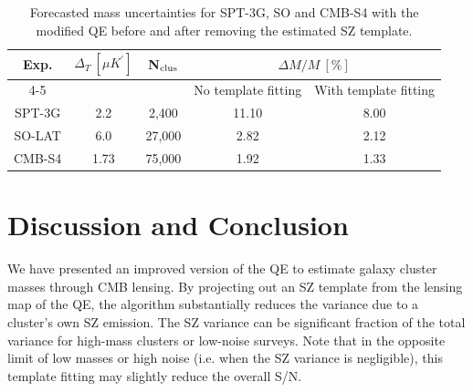\begin{table}
\caption{Forecasted mass uncertainties for SPT-3G, SO and CMB-S4  with the modified QE before and after removing the estimated SZ template.}
\footnotesize{
\centering
\begin{tabular}{| c | c |  c | c | c  |}
\hline
 \multirow{2}{*}{Exp.} &  \multirow{2}{*}{$\Delta_{T}\ [\mu K^{\prime}]$} & \multirow{3}{*}{N$_{\rm clus}$} & \multicolumn{2}{c|}{$\Delta M/M\ [\%]$}\\
\cline{4-5}
 & & & No template fitting & With template fitting\\\hline
SPT-3G & 2.2 & 2,400 &11.10& 8.00 \\\hline
 SO-LAT & 6.0 & 27,000 &2.82 &2.12 \\\hline
CMB-S4 & 1.73 & 75,000 &1.92 & 1.33\\\hline

\end{tabular}
}
\label{table_forecast_setup}
\end{table}


\section{Discussion and Conclusion}
\label{temp_fit_conclusions}

We have presented an improved version of the QE to estimate galaxy cluster masses through CMB lensing. 
By projecting out an SZ template from the lensing map of the QE, the algorithm substantially reduces the variance due to a cluster's own SZ emission. 
The SZ variance can be significant fraction of the total variance for high-mass clusters or low-noise surveys. 
Note that in the opposite limit of low masses or high noise (i.e. when the SZ variance is negligible), this template fitting may slightly reduce the overall S/N. 

